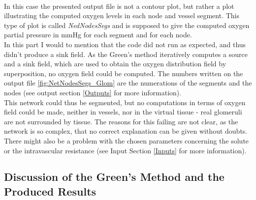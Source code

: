 \\In this case the presented output file is not a contour plot, but rather a plot illustrating the computed oxygen levels in each node and vessel segment. This type of plot is called \emph{NedNodesSegs} and is supposed to give the computed oxygen partial pressure in mmHg for each segment and for each node.
\\In this part I would to mention that the code did not run as expected, and thus didn't produce a sink field. As the Green's method iteratively computes a source and a sink field, which are used to obtain the oxygen distribution field by superposition, no oxygen field could be computed. The numbers written on the output file \ref{fig:NetNodesSegs_Glom} are the numerations of the segments and the nodes (see output section \ref{Outputs} for more information).
\\This network could thus be segmented, but no computations in terms of oxygen field could be made, neither in vessels, nor in the virtual tissue - real glomeruli are not surrounded by tissue. The reasons for this failing are not clear, as the network is so complex, that no correct explanation can be given without doubts. There might also be a problem with the chosen parameters concerning the solute or the intravascular resistance (see Input Section \ref{Inputs} for more information).

\newpage
\subsection{Discussion of the Green's Method and the Produced Results}
\label{DiscGreens}

